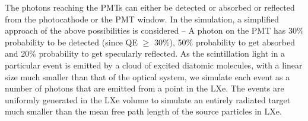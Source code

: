 The photons reaching the PMTs can either be detected or absorbed or reflected from the photocathode 
or the PMT window. In the simulation, a simplified approach of the above possibilities is considered -- 
A photon on the PMT has 30\% probability to be detected (since QE $\geq$ 30\%), 50\% probability to get 
absorbed and 20\% probability to get specularly reflected. As the scintillation light in a particular 
event is emitted by a cloud of excited diatomic molecules, with a linear size much smaller than that 
of the optical system, we simulate each event as a number of photons that are emitted from a point 
in the LXe. The events are uniformly generated in the LXe volume to simulate an entirely radiated 
target much smaller than the mean free path length of the source particles in LXe.


